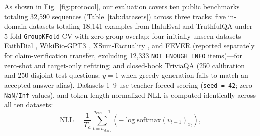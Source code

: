 \documentclass[10pt,twocolumn,letterpaper]{article}
\begin{document}
As shown in Fig.~\ref{fig:protocol}, our evaluation covers ten public benchmarks totaling 32,590 sequences (Table~\ref{tab:datasets}) across three tracks: five in-domain datasets totaling 18,141 examples from HaluEval \cite{review29} and TruthfulQA \cite{review22} under 5-fold \texttt{GroupKFold} CV with zero group overlap; four initially unseen datasets---FaithDial \cite{dziri2022faithdial}, WikiBio-GPT3 \cite{review21}, XSum-Factuality \cite{maynez2020faithfulness}, and FEVER \cite{thorne2018fever} (reported separately for claim-verification transfer, excluding 12,333 \texttt{NOT ENOUGH INFO} items)---for zero-shot and target-only refitting; and closed-book TriviaQA \cite{joshi2017triviaqa} (250 calibration and 250 disjoint test questions; $y = 1$ when greedy generation fails to match an accepted answer alias). Datasets 1--9 use teacher-forced scoring (\texttt{seed = 42}; zero \texttt{NaN}/\texttt{Inf} values), and token-length-normalized NLL is computed identically across all ten datasets:
\begin{equation}
\text{NLL} = \frac{1}{T_a} \sum_{t = a_{\text{start}}}^{a_{\text{end}} - 1} \left(-\log \text{softmax}(v_{t-1})_{x_t}\right),
\label{eq:nll}
\end{equation}
\end{document}
